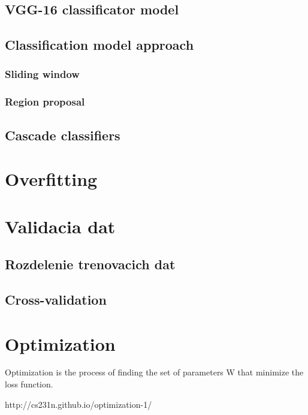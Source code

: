 \documentclass[10pt,a4paper]{article}
\begin{document}
\subsection{VGG-16 classificator model}

\subsection{Classification model approach}

\subsubsection{Sliding window}

\subsubsection{Region proposal}

\subsection{Cascade classifiers}



\section{Overfitting}




\section{Validacia dat}

\subsection{Rozdelenie trenovacich dat}

\subsection{Cross-validation}



\section{Optimization}
Optimization is the process of finding the set of parameters W that minimize the loss function.

http://cs231n.github.io/optimization-1/
\end{document}
